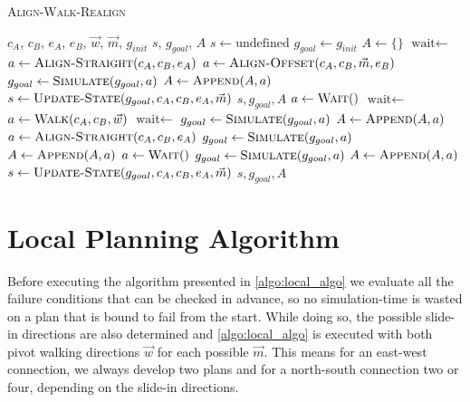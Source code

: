 \begin{algorithm}
	\caption{\scshape Align-Walk-Realign}
	\label{algo:local_algo}
	\begin{algorithmic}[1]
		\REQUIRE $c_A$, $c_B$, $e_A$, $e_B$, $\vec{w}$, $\vec{m}$, $g_{init}$ 
		\ENSURE $s$, $g_{goal}$, $A$
		\STATE $s \gets \text{undefined}$
		\STATE $g_{goal} \gets g_{init}$
		\STATE $A \gets \{\}$
		\STATE $\text{wait} \gets$ \TRUE
		\LOOP
				\STATE $a \gets \text{\scshape Align-Straight}(c_A, c_B, e_A)$
			\ELSE
				\STATE $a \gets \text{\scshape Align-Offset}(c_A, c_B, \vec{m}, e_B)$
			\ENDIF
			\STATE $g_{goal} \gets \text{\scshape Simulate}(g_{goal}, a)$
			\STATE $A \gets \text{\scshape Append}(A, a)$
			\STATE $s \gets \text{\scshape Update-State}(g_{goal}, c_A, c_B, e_A, \vec{m})$
				\RETURN $s, g_{goal}, A$
			\ENDIF
				\STATE $a \gets \text{\scshape Wait}()$
				\STATE $\text{wait} \gets$ \FALSE
			\ELSE
				\STATE $a \gets \text{\scshape Walk}(c_A, c_B, \vec{w})$
				\STATE $\text{wait} \gets$ \TRUE
			\ENDIF
			\STATE $g_{goal} \gets \text{\scshape Simulate}(g_{goal}, a)$
			\STATE $A \gets \text{\scshape Append}(A, a)$
				\STATE $a \gets \text{\scshape Align-Straight}(c_A, c_B, e_A)$
				\STATE $g_{goal} \gets \text{\scshape Simulate}(g_{goal}, a)$
				\STATE $A \gets \text{\scshape Append}(A, a)$
					\STATE $a \gets \text{\scshape Wait}()$
					\STATE $g_{goal} \gets \text{\scshape Simulate}(g_{goal}, a)$
					\STATE $A \gets \text{\scshape Append}(A, a)$
				\ENDWHILE
			\ENDIF
			\STATE $s \gets \text{\scshape Update-State}(g_{goal}, c_A, c_B, e_A, \vec{m})$
				\RETURN $s, g_{goal}, A$
			\ENDIF
		\ENDLOOP 
	\end{algorithmic}
\end{algorithm}

\section{Local Planning Algorithm}
\label{sec:local_algo}

Before executing the algorithm presented in \autoref{algo:local_algo} we evaluate all the failure conditions that can be checked in advance, so no simulation-time is wasted on a plan that is bound to fail from the start.
While doing so, the possible slide-in directions are also determined and \autoref{algo:local_algo} is executed with both pivot walking directions $\vec{w}$ for each possible $\vec{m}$.
This means for an east-west connection, we always develop two plans and for a north-south connection two or four, depending on the slide-in directions.


